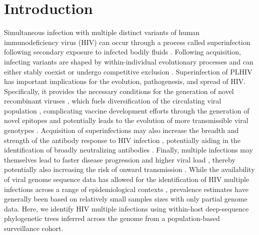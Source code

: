 \documentclass[10pt,letterpaper]{article}
\begin{document}
\section{Introduction}
Simultaneous infection with multiple distinct variants of human immunodeficiency virus (HIV) can occur through a process called superinfection following secondary exposure to infected bodily fluids \cite{redd2013}. Following acquisition, infecting variants are shaped by within-individual evolutionary processes and can either stably coexist or undergo competitive exclusion \cite{redd2012, wertheim2018}. Superinfection of PLHIV has important implications for the evolution, pathogenesis, and spread of HIV. Specifically, it provides the necessary conditions for the generation of novel recombinant viruses \cite{fang2004, streeck2008}, which fuels diversification of the circulating viral population \cite{ramirez2008, kim2024}, complicating vaccine development efforts through the generation of novel epitopes \cite{ritchie2014, corey2010} and potentially leads to the evolution of more transmissible viral genotypes \cite{kiwanuka2009}. Acquisition of superinfections may also increase the breadth and strength of the antibody response to HIV infection \cite{powell2010, cortez2012, krebs2019}, potentially aiding in the identification of broadly neutralizing antibodies \cite{sok018}. Finally, multiple infections may themselves lead to faster disease progression \cite{gottlieb2004, smith2004, ronen2014} and higher viral load \cite{ronen2014, smith2004}, thereby potentially also increasing the risk of onward transmission \cite{quinn2000, fraser2007}. While the availability of viral genome sequence data has allowed for the identification of HIV multiple infections across a range of epidemiological contexts \cite{yuan2024}, prevalence estimates have generally been based on relatively small samples sizes with only partial genome data. Here, we identify HIV multiple infections using within-host deep-sequence phylogenetic trees inferred across the genome from a population-based surveillance cohort. \par
\end{document}
